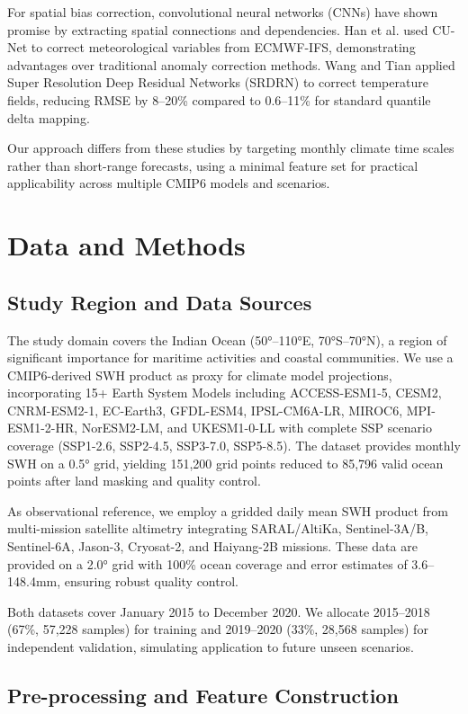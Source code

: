 \documentclass[conference]{IEEEtran}
\begin{document}
For spatial bias correction, convolutional neural networks (CNNs) have shown promise by extracting spatial connections and dependencies. Han et al. used CU-Net to correct meteorological variables from ECMWF-IFS, demonstrating advantages over traditional anomaly correction methods. Wang and Tian applied Super Resolution Deep Residual Networks (SRDRN) to correct temperature fields, reducing RMSE by 8--20\% compared to 0.6--11\% for standard quantile delta mapping.

Our approach differs from these studies by targeting monthly climate time scales rather than short-range forecasts, using a minimal feature set for practical applicability across multiple CMIP6 models and scenarios.

\section{Data and Methods}

\subsection{Study Region and Data Sources}

The study domain covers the Indian Ocean (50°--110°E, 70°S--70°N), a region of significant importance for maritime activities and coastal communities. We use a CMIP6-derived SWH product as proxy for climate model projections, incorporating 15+ Earth System Models including ACCESS-ESM1-5, CESM2, CNRM-ESM2-1, EC-Earth3, GFDL-ESM4, IPSL-CM6A-LR, MIROC6, MPI-ESM1-2-HR, NorESM2-LM, and UKESM1-0-LL with complete SSP scenario coverage (SSP1-2.6, SSP2-4.5, SSP3-7.0, SSP5-8.5). The dataset provides monthly SWH on a 0.5° grid, yielding 151,200 grid points reduced to 85,796 valid ocean points after land masking and quality control.

As observational reference, we employ a gridded daily mean SWH product from multi-mission satellite altimetry integrating SARAL/AltiKa, Sentinel-3A/B, Sentinel-6A, Jason-3, Cryosat-2, and Haiyang-2B missions. These data are provided on a 2.0° grid with 100\% ocean coverage and error estimates of 3.6--148.4mm, ensuring robust quality control.

Both datasets cover January 2015 to December 2020. We allocate 2015--2018 (67\%, 57,228 samples) for training and 2019--2020 (33\%, 28,568 samples) for independent validation, simulating application to future unseen scenarios.

\subsection{Pre-processing and Feature Construction}
\end{document}
